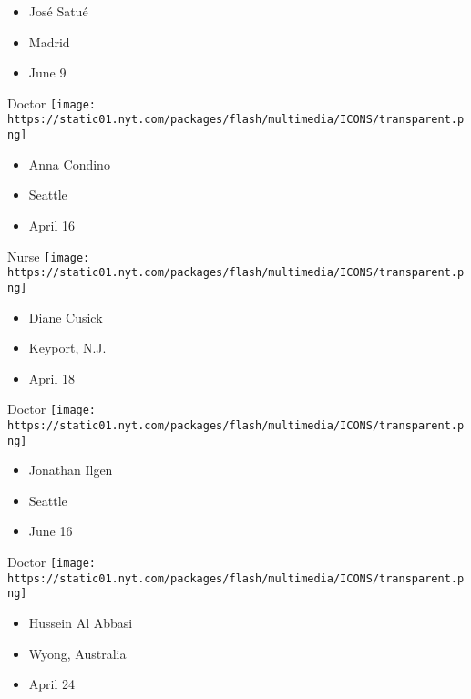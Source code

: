 \begin{itemize}
\tightlist
\item
  José Satué
\item
  Madrid
\item
  June 9
\end{itemize}

\protect\hyperlink{item-anna-condino}{}

Doctor
\texttt{[image: https://static01.nyt.com/packages/flash/multimedia/ICONS/transparent.png]}

\begin{itemize}
\tightlist
\item
  Anna Condino
\item
  Seattle
\item
  April 16
\end{itemize}

\protect\hyperlink{item-diane-cusick}{}

Nurse
\texttt{[image: https://static01.nyt.com/packages/flash/multimedia/ICONS/transparent.png]}

\begin{itemize}
\tightlist
\item
  Diane Cusick
\item
  Keyport, N.J.
\item
  April 18
\end{itemize}

\protect\hyperlink{item-jonathan-ilgen}{}

Doctor
\texttt{[image: https://static01.nyt.com/packages/flash/multimedia/ICONS/transparent.png]}

\begin{itemize}
\tightlist
\item
  Jonathan Ilgen
\item
  Seattle
\item
  June 16
\end{itemize}

\protect\hyperlink{item-hussein-al-abbasi}{}

Doctor
\texttt{[image: https://static01.nyt.com/packages/flash/multimedia/ICONS/transparent.png]}

\begin{itemize}
\tightlist
\item
  Hussein Al Abbasi
\item
  Wyong, Australia
\item
  April 24
\end{itemize}

\protect\hyperlink{item-taylor-laufer}{}

